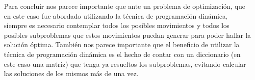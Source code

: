 Para concluir nos parece importante que ante un problema de optimización, que en este caso fue abordado utilizando la técnica de programación dinámica, siempre es necesario contemplar todos los posibles movimientos y todos los posibles subproblemas que estos movimientos puedan generar para poder hallar la solución óptima. También nos parece importante que el beneficio de utilizar la técnica de programación dinámica es el hecho de contar con un diccionario (en este caso una matriz) que tenga ya resueltos los subproblemas, evitando calcular las soluciones de los mismos más de una vez.